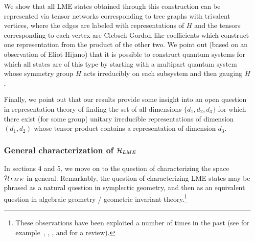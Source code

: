 \documentclass[12pt]{article}
\theoremstyle{definition}
\begin{document}
We show that all LME states obtained through this construction can be represented via tensor networks corresponding to tree graphs with trivalent vertices, where the edges are labeled with representations of $H$ and the tensors corresponding to each vertex are Clebsch-Gordon like coefficients which construct one representation from the product of the other two. We point out (based on an observation of Eliot Hijano) that it is possible to construct quantum systems for which all states are of this type by starting with a multipart quantum system whose symmetry group $H$ acts irreducibly on each subsystem and then gauging $H$.

Finally, we point out that our results provide some insight into an open question in representation theory of finding the set of all dimensions $\{d_1, d_2, d_3\}$ for which there exist (for some group) unitary irreducible representations of dimension $(d_1,d_2)$ whose tensor product contains a representation of dimension $d_3$.

\subsubsection*{General characterization of ${\cal H}_{LME}$}

In sections 4 and 5, we move on to the question of
characterizing the space ${\cal H}_{LME}$ in general.
Remarkably, the question of characterizing LME states may be phrased as a natural question in symplectic
geometry, and then as an equivalent question in algebraic geometry / geometric invariant theory.\footnote{
These observations have been exploited a number of times in the past (see for example~\cite{Kly02}, \cite[\S~3]{Kly07}, \cite[\S~4]{wallach}, and \cite{Walter} for a review).}
\end{document}
